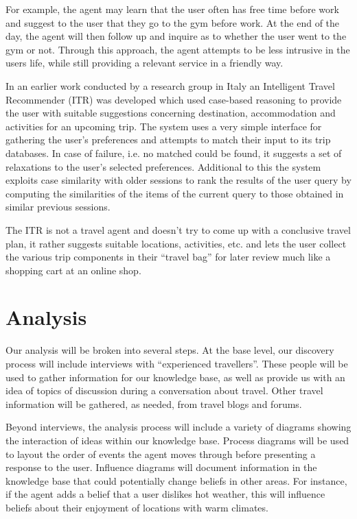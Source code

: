 \documentclass[11pt]{article} %
\begin{document}
For example, the agent may learn that the user often has free
time before work and suggest to the user that they go to the
gym before work. At the end of the day, the agent will then
follow up and inquire as to whether the user went to the gym
or not. Through this approach, the agent attempts to be less
intrusive in the users life, while still providing a relevant
service in a friendly way.

In an earlier work conducted by a research group in Italy an
Intelligent Travel Recommender (ITR) was developed which used
case-based reasoning to provide the user with suitable
suggestions concerning destination, accommodation and
activities for an upcoming trip. The system uses a very
simple interface for gathering the user’s preferences and
attempts to match their input to its trip databases. In case
of failure, i.e. no matched could be found, it suggests a set
of relaxations to the user’s selected preferences. Additional
to this the system exploits case similarity with older sessions
to rank the results of the user query by computing the
similarities of the items of the current query to those
obtained in similar previous sessions.

The ITR is not a travel agent and doesn’t try to come up
with a conclusive travel plan, it rather suggests suitable
locations, activities, etc. and lets the user collect the
various trip components in their ``travel bag'' for later
review much like a shopping cart at an online shop. 

\section{Analysis}
Our analysis will be broken into several steps. At the
base level, our discovery process will include interviews
with ``experienced travellers''. These people will be used
to gather information for our knowledge base, as well as
provide us with an idea of topics of discussion during a
conversation about travel. Other travel information will
be gathered, as needed, from travel blogs and forums.

Beyond interviews, the analysis process will include a
variety of diagrams showing the interaction of ideas
within our knowledge base. Process diagrams will be used
to layout the order of events the agent moves through
before presenting a response to the user.
Influence diagrams will document information in the
knowledge base that could potentially change beliefs
in other areas. For instance, if the agent adds a belief
that a user dislikes hot weather, this will influence
beliefs about their enjoyment of locations with warm climates.
\end{document}
